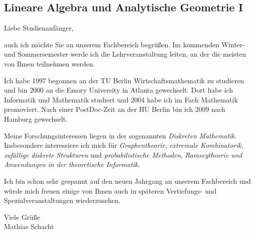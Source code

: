 \subsection{Lineare Algebra und Analytische Geometrie I}

Liebe Studienanfänger,

auch ich möchte Sie an unserem Fachbereich begrüßen. Im kommenden Winter- und
Sommersemester werde ich die Lehrveranstaltung  leiten, an der die meisten von Ihnen teilnehmen werden.

Ich habe 1997 begonnen an der TU Berlin Wirtschaftsmathematik zu studieren und
bin 2000 an die Emory University in Atlanta gewechselt. Dort habe ich
Informatik und Mathematik studiert und 2004 habe ich im Fach Mathematik
promoviert.  Nach einer PostDoc-Zeit an der HU Berlin bin ich 2009 nach Hamburg
gewechselt.

Meine Forschungsinteressen liegen in der sogenannten \emph{Diskreten
Mathematik}. Insbesondere interessiere ich mich für \emph{Graphentheorie},
\emph{extremale Kombinatorik}, \emph{zufällige diskrete Strukturen} und
\emph{probabilistische Methoden}, \emph{Ramseytheorie und Anwendungen in der
theoretische Informatik}.

Ich bin schon sehr gespannt auf den neuen Jahrgang an unserem Fachbereich und
würde mich freuen einige von Ihnen auch in späteren Vertiefungs- und
Spezialveranstaltungen wiederzusehen.

Viele Grüße\\
Mathias Schacht 

